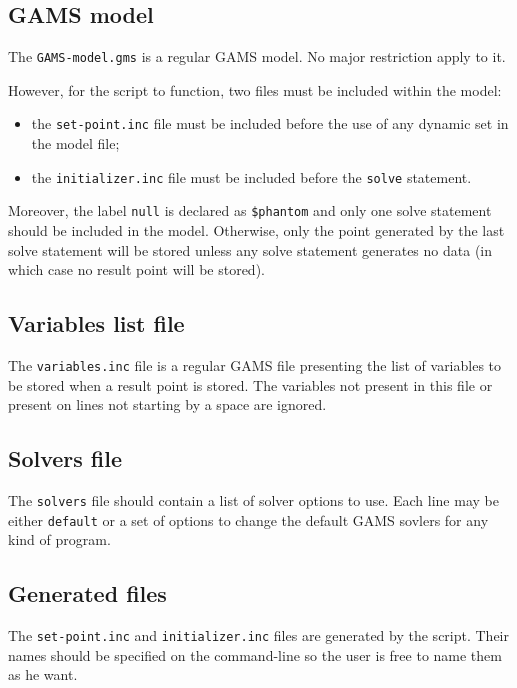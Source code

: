 \subsection*{GAMS model}

The \texttt{GAMS-model.gms} is a regular GAMS model. No major restriction apply
to it.

However, for the script to function, two files must be included within the
model:
\begin{itemize}
\item the \texttt{set-point.inc} file must be included before the use of any
  dynamic set in the model file;
\item the \texttt{initializer.inc} file must be included before the
  \texttt{solve} statement.
\end{itemize}
Moreover, the label \texttt{null} is declared as \texttt{\$phantom} and only one
solve statement should be included in the model. Otherwise, only the point
generated by the last solve statement will be stored unless any solve statement
generates no data (in which case no result point will be stored).

\subsection*{Variables list file}

The \texttt{variables.inc} file is a regular GAMS file presenting the list of
variables to be stored when a result point is stored. The variables not present
in this file or present on lines not starting by a space are ignored.

\subsection*{Solvers file}

The \texttt{solvers} file should contain a list of solver options to use. Each
line may be either \texttt{default} or a set of options to change the default
GAMS sovlers for any kind of program.

\subsection*{Generated files}

The \texttt{set-point.inc} and \texttt{initializer.inc} files are generated by
the script. Their names should be specified on the command-line so the user is
free to name them as he want.

